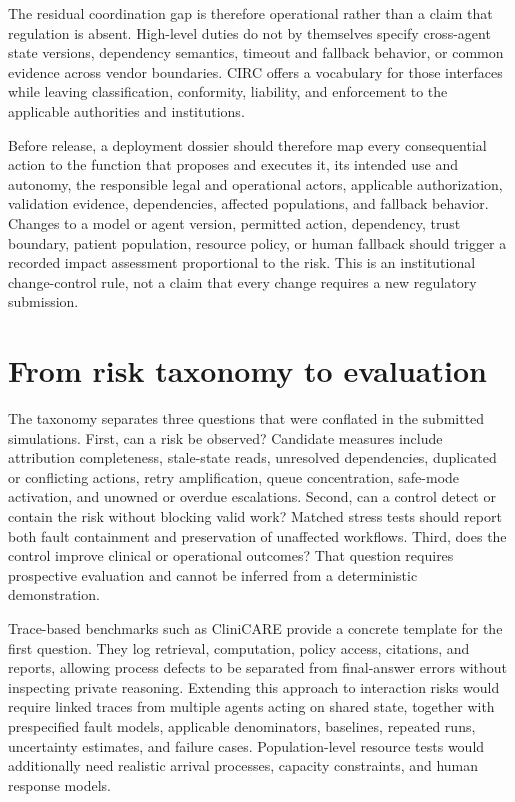 \documentclass[10pt]{article}
\begin{document}
The residual coordination gap is therefore operational rather than a claim that regulation is absent.
High-level duties do not by themselves specify cross-agent state versions, dependency semantics,
timeout and fallback behavior, or common evidence across vendor boundaries. CIRC offers a vocabulary
for those interfaces while leaving classification, conformity, liability, and enforcement to the
applicable authorities and institutions.

Before release, a deployment dossier should therefore map every consequential action to the function
that proposes and executes it, its intended use and autonomy, the responsible legal and operational
actors, applicable authorization, validation evidence, dependencies, affected populations, and
fallback behavior. Changes to a model or agent version, permitted action, dependency, trust boundary,
patient population, resource policy, or human fallback should trigger a recorded impact assessment
proportional to the risk. This is an institutional change-control rule, not a claim that every change
requires a new regulatory submission.

\section{From risk taxonomy to evaluation}

The taxonomy separates three questions that were conflated in the submitted simulations. First, can
a risk be observed? Candidate measures include attribution completeness, stale-state reads,
unresolved dependencies, duplicated or conflicting actions, retry amplification, queue concentration,
safe-mode activation, and unowned or overdue escalations. Second, can a control detect or contain the risk without blocking valid work?
Matched stress tests should report both fault containment and preservation of unaffected workflows.
Third, does the control improve clinical or operational outcomes? That question requires prospective
evaluation and cannot be inferred from a deterministic demonstration.

Trace-based benchmarks such as CliniCARE provide a concrete template for the first question. They log
retrieval, computation, policy access, citations, and reports, allowing process defects to be separated
from final-answer errors without inspecting private reasoning. Extending this approach to interaction
risks would require linked traces from multiple agents acting on shared state, together with
prespecified fault models, applicable denominators, baselines, repeated runs, uncertainty estimates,
and failure cases. Population-level resource tests would additionally need realistic arrival
processes, capacity constraints, and human response models.
\end{document}
